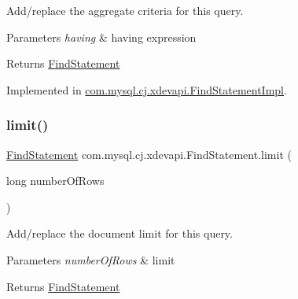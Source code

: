 Add/replace the aggregate criteria for this query.


\begin{DoxyParams}{Parameters}
{\em having} & having expression \\
\hline
\end{DoxyParams}
\begin{DoxyReturn}{Returns}
\mbox{\hyperlink{interfacecom_1_1mysql_1_1cj_1_1xdevapi_1_1_find_statement}{Find\+Statement}} 
\end{DoxyReturn}


Implemented in \mbox{\hyperlink{classcom_1_1mysql_1_1cj_1_1xdevapi_1_1_find_statement_impl_aa5772a01729fde08c5959498e56b5448}{com.\+mysql.\+cj.\+xdevapi.\+Find\+Statement\+Impl}}.

\mbox{\label{interfacecom_1_1mysql_1_1cj_1_1xdevapi_1_1_find_statement_a62c093679f1d534a4e7e40c5f78f7ed0}} 
\subsubsection{\texorpdfstring{limit()}{limit()}}
{\footnotesize\ttfamily \mbox{\hyperlink{interfacecom_1_1mysql_1_1cj_1_1xdevapi_1_1_find_statement}{Find\+Statement}} com.\+mysql.\+cj.\+xdevapi.\+Find\+Statement.\+limit (\begin{DoxyParamCaption}\item[{long}]{number\+Of\+Rows }\end{DoxyParamCaption})}

Add/replace the document limit for this query.


\begin{DoxyParams}{Parameters}
{\em number\+Of\+Rows} & limit \\
\hline
\end{DoxyParams}
\begin{DoxyReturn}{Returns}
\mbox{\hyperlink{interfacecom_1_1mysql_1_1cj_1_1xdevapi_1_1_find_statement}{Find\+Statement}} 
\end{DoxyReturn}
\mbox{\label{interfacecom_1_1mysql_1_1cj_1_1xdevapi_1_1_find_statement_af7d8cbf89d9c5c6caf6c0d89490b5d06}} 
